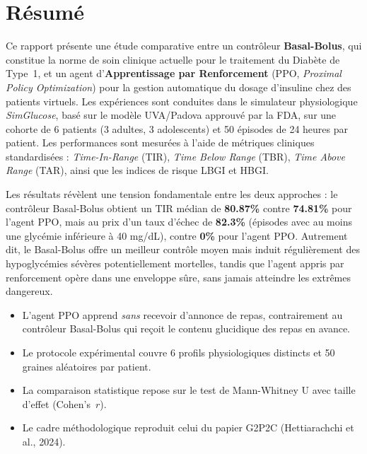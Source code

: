 \documentclass[a4paper,12pt]{report}
\begin{document}
\chapter{Résumé}

Ce rapport présente une étude comparative entre un contrôleur \textbf{Basal-Bolus}, qui constitue la norme de soin clinique actuelle pour le traitement du Diabète de Type~1, et un agent d'\textbf{Apprentissage par Renforcement} (PPO, \textit{Proximal Policy Optimization}) pour la gestion automatique du dosage d'insuline chez des patients virtuels. Les expériences sont conduites dans le simulateur physiologique \textit{SimGlucose}, basé sur le modèle UVA/Padova approuvé par la FDA, sur une cohorte de 6 patients (3 adultes, 3 adolescents) et 50 épisodes de 24 heures par patient. Les performances sont mesurées à l'aide de métriques cliniques standardisées : \textit{Time-In-Range} (TIR), \textit{Time Below Range} (TBR), \textit{Time Above Range} (TAR), ainsi que les indices de risque LBGI et HBGI.

Les résultats révèlent une tension fondamentale entre les deux approches : le contrôleur Basal-Bolus obtient un TIR médian de \textbf{80.87\%} contre \textbf{74.81\%} pour l'agent PPO, mais au prix d'un taux d'échec de \textbf{82.3\%} (épisodes avec au moins une glycémie inférieure à 40 mg/dL), contre \textbf{0\%} pour l'agent PPO. Autrement dit, le Basal-Bolus offre un meilleur contrôle moyen mais induit régulièrement des hypoglycémies sévères potentiellement mortelles, tandis que l'agent appris par renforcement opère dans une enveloppe sûre, sans jamais atteindre les extrêmes dangereux.

\begin{tcolorbox}[mybox, title=Points clés]
\begin{itemize}[noitemsep]
  \item L'agent PPO apprend \emph{sans} recevoir d'annonce de repas, contrairement au contrôleur Basal-Bolus qui reçoit le contenu glucidique des repas en avance.
  \item Le protocole expérimental couvre 6 profils physiologiques distincts et 50 graines aléatoires par patient.
  \item La comparaison statistique repose sur le test de Mann-Whitney U avec taille d'effet (Cohen's~$r$).
  \item Le cadre méthodologique reproduit celui du papier G2P2C (Hettiarachchi et al., 2024).
\end{itemize}
\end{tcolorbox}
\end{document}
